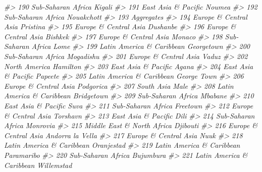 \documentclass[
  xelatex, ja=standard]{bxjsbook}
\newenvironment{Shaded}{\begin{snugshade}}{\end{snugshade}}
\newcommand{\CommentTok}[1]{\textcolor[rgb]{0.56,0.35,0.01}{\textit{#1}}}
\theoremstyle{definition}
\theoremstyle{definition}
\theoremstyle{definition}
\theoremstyle{definition}
\theoremstyle{remark}
\begin{document}
\begin{Shaded}
\begin{Highlighting}[]
\CommentTok{\#\textgreater{} 190         Sub{-}Saharan Africa              Kigali}
\CommentTok{\#\textgreater{} 191        East Asia \& Pacific             Noum\textquotesingle{}ea}
\CommentTok{\#\textgreater{} 192         Sub{-}Saharan Africa          Nouakchott}
\CommentTok{\#\textgreater{} 193                 Aggregates                    }
\CommentTok{\#\textgreater{} 194      Europe \& Central Asia            Pristina}
\CommentTok{\#\textgreater{} 195      Europe \& Central Asia            Dushanbe}
\CommentTok{\#\textgreater{} 196      Europe \& Central Asia             Bishkek}
\CommentTok{\#\textgreater{} 197      Europe \& Central Asia              Monaco}
\CommentTok{\#\textgreater{} 198         Sub{-}Saharan Africa                Lome}
\CommentTok{\#\textgreater{} 199  Latin America \& Caribbean          Georgetown}
\CommentTok{\#\textgreater{} 200         Sub{-}Saharan Africa           Mogadishu}
\CommentTok{\#\textgreater{} 201      Europe \& Central Asia               Vaduz}
\CommentTok{\#\textgreater{} 202              North America            Hamilton}
\CommentTok{\#\textgreater{} 203        East Asia \& Pacific               Agana}
\CommentTok{\#\textgreater{} 204        East Asia \& Pacific             Papeete}
\CommentTok{\#\textgreater{} 205  Latin America \& Caribbean         George Town}
\CommentTok{\#\textgreater{} 206      Europe \& Central Asia           Podgorica}
\CommentTok{\#\textgreater{} 207                 South Asia                Male}
\CommentTok{\#\textgreater{} 208  Latin America \& Caribbean          Bridgetown}
\CommentTok{\#\textgreater{} 209         Sub{-}Saharan Africa             Mbabane}
\CommentTok{\#\textgreater{} 210        East Asia \& Pacific                Suva}
\CommentTok{\#\textgreater{} 211         Sub{-}Saharan Africa            Freetown}
\CommentTok{\#\textgreater{} 212      Europe \& Central Asia            Torshavn}
\CommentTok{\#\textgreater{} 213        East Asia \& Pacific                Dili}
\CommentTok{\#\textgreater{} 214         Sub{-}Saharan Africa            Monrovia}
\CommentTok{\#\textgreater{} 215 Middle East \& North Africa            Djibouti}
\CommentTok{\#\textgreater{} 216      Europe \& Central Asia    Andorra la Vella}
\CommentTok{\#\textgreater{} 217      Europe \& Central Asia                Nuuk}
\CommentTok{\#\textgreater{} 218  Latin America \& Caribbean          Oranjestad}
\CommentTok{\#\textgreater{} 219  Latin America \& Caribbean          Paramaribo}
\CommentTok{\#\textgreater{} 220         Sub{-}Saharan Africa           Bujumbura}
\CommentTok{\#\textgreater{} 221  Latin America \& Caribbean          Willemstad}

\end{Highlighting}
\end{Shaded}
\end{document}
